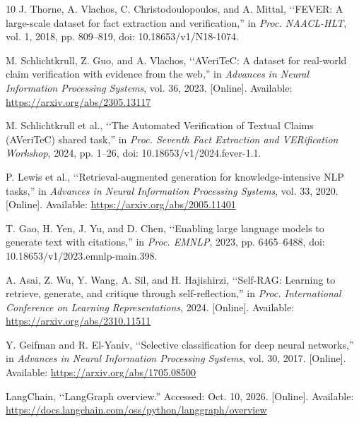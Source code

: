 \documentclass[conference]{IEEEtran}
\begin{document}
\begin{thebibliography}{10}
J. Thorne, A. Vlachos, C. Christodoulopoulos, and A. Mittal, \lq\lq FEVER: A large-scale dataset for fact extraction and verification,'' in \emph{Proc. NAACL-HLT}, vol. 1, 2018, pp. 809--819, doi: 10.18653/v1/N18-1074.

M. Schlichtkrull, Z. Guo, and A. Vlachos, \lq\lq AVeriTeC: A dataset for real-world claim verification with evidence from the web,'' in \emph{Advances in Neural Information Processing Systems}, vol. 36, 2023. [Online]. Available: \url{https://arxiv.org/abs/2305.13117}

M. Schlichtkrull et al., \lq\lq The Automated Verification of Textual Claims (AVeriTeC) shared task,'' in \emph{Proc. Seventh Fact Extraction and VERification Workshop}, 2024, pp. 1--26, doi: 10.18653/v1/2024.fever-1.1.

P. Lewis et al., \lq\lq Retrieval-augmented generation for knowledge-intensive NLP tasks,'' in \emph{Advances in Neural Information Processing Systems}, vol. 33, 2020. [Online]. Available: \url{https://arxiv.org/abs/2005.11401}

T. Gao, H. Yen, J. Yu, and D. Chen, \lq\lq Enabling large language models to generate text with citations,'' in \emph{Proc. EMNLP}, 2023, pp. 6465--6488, doi: 10.18653/v1/2023.emnlp-main.398.

A. Asai, Z. Wu, Y. Wang, A. Sil, and H. Hajishirzi, \lq\lq Self-RAG: Learning to retrieve, generate, and critique through self-reflection,'' in \emph{Proc. International Conference on Learning Representations}, 2024. [Online]. Available: \url{https://arxiv.org/abs/2310.11511}

Y. Geifman and R. El-Yaniv, \lq\lq Selective classification for deep neural networks,'' in \emph{Advances in Neural Information Processing Systems}, vol. 30, 2017. [Online]. Available: \url{https://arxiv.org/abs/1705.08500}

LangChain, \lq\lq LangGraph overview.'' Accessed: Oct. 10, 2026. [Online]. Available: \url{https://docs.langchain.com/oss/python/langgraph/overview}
\end{thebibliography}
\end{document}
